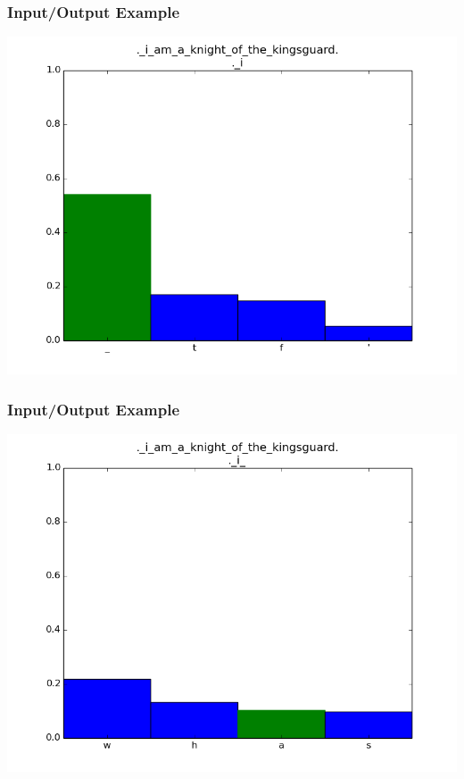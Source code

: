 \documentclass[12]{beamer}
\begin{document}
\begin{frame}
\frametitle{Input/Output Example}
\begin{center}
\includegraphics[scale=0.4]{../distplot/02.png}
\end{center}
\end{frame}

\begin{frame}
\frametitle{Input/Output Example}
\begin{center}
\includegraphics[scale=0.4]{../distplot/03.png}
\end{center}
\end{frame}
\end{document}
